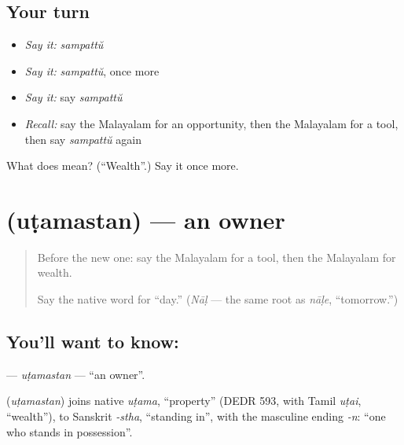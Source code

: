 \subsection*{Your turn}
\begin{itemize}
\raggedright
  \item \emph{Say it:} \emph{sampattŭ}
  \item \emph{Say it:} \emph{sampattŭ}, once more
  \item \emph{Say it:} say \emph{sampattŭ}
  \item \emph{Recall:} say the Malayalam for an opportunity, then the Malayalam for a tool, then say \emph{sampattŭ} again
\end{itemize}

\begin{tcolorbox}[breakable,colback=teal!4,colframe=teal!35!black,title={Before you move on}]
What does  mean? (\textquotedblleft{}Wealth\textquotedblright{}.) Say it once more.
\end{tcolorbox}
\section[\texorpdfstring{\ml{ഉടമസ്ഥൻ} (uṭamastan)}{ഉടമസ്ഥൻ (uṭamastan)}]{ (uṭamastan) — an owner}

\label{lesson:ML-C143-utamastan}



\begin{quote}
Before the new one: say the Malayalam for a tool, then the Malayalam for wealth.

Say the native word for \textquotedblleft{}day.\textquotedblright{} (\emph{Nāḷ} — the same root as \emph{nāḷe}, \textquotedblleft{}tomorrow.\textquotedblright{})
\end{quote}

\subsection*{You'll want to know: }
\textbf{} — \emph{uṭamastan} — \textquotedblleft{}an owner\textquotedblright{}.

\begin{cousinweb}
\textbf{} (\emph{uṭamastan}) joins native \emph{uṭama}, \textquotedblleft{}property\textquotedblright{} (DEDR 593, with Tamil \emph{uṭai}, \textquotedblleft{}wealth\textquotedblright{}), to Sanskrit \emph{-stha}, \textquotedblleft{}standing in\textquotedblright{}, with the masculine ending \emph{-n}: \textquotedblleft{}one who stands in possession\textquotedblright{}.
\end{cousinweb}

